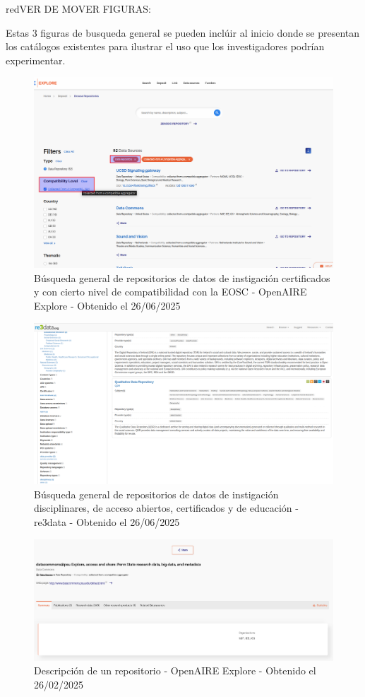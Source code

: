 \documentclass[runningheads]{llncs}
\def \bchregi {\begin{color}{red}}
\def \echregi {\end{color}}
\begin{document}
\bchregi VER DE MOVER FIGURAS: \echregi
Estas 3 figuras de busqueda general se pueden inclúir al inicio donde se presentan los catálogos existentes para ilustrar el uso que los investigadores podrían experimentar.\\


\begin{figure}
    \centering
    \includegraphics[width=0.5\linewidth]{img/openaire_gral_search.png}
    \caption{
Búsqueda general de repositorios de datos de instigación certificados y con cierto nivel de compatibilidad con la EOSC - OpenAIRE Explore - Obtenido el 26/06/2025
    }
    \label{fig:openaire_gral_search}
\end{figure}

\begin{figure}
    \centering
    \includegraphics[width=0.5\linewidth]{img/re3data_busqueda_general.png}
    \caption{
Búsqueda general de repositorios de datos de instigación disciplinares, de acceso abiertos, certificados y de educación - re3data - Obtenido el 26/06/2025
    }
    \label{fig:re3data_busqueda_general}
\end{figure}

\begin{figure}
    \centering
    \includegraphics[width=0.5\linewidth]{img/repositorio_openaire.png}
    \caption{Descripción de un repositorio - OpenAIRE Explore - Obtenido el 26/02/2025}
    \label{fig:repositorio_openaire}
\end{figure}
\end{document}
